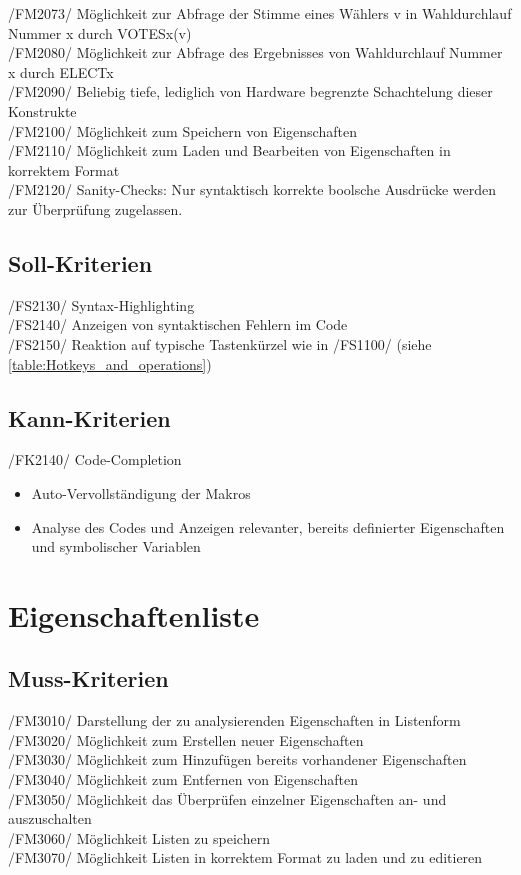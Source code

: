 \documentclass[a4paper]{scrreprt}
\begin{document}
/FM2073/ Möglichkeit zur Abfrage der Stimme eines Wählers v in Wahldurchlauf Nummer x durch VOTESx(v)\\
/FM2080/ Möglichkeit zur Abfrage des Ergebnisses von Wahldurchlauf Nummer x durch ELECTx \\
/FM2090/ Beliebig tiefe, lediglich von Hardware begrenzte Schachtelung dieser Konstrukte \\
/FM2100/ Möglichkeit zum Speichern von Eigenschaften \\
/FM2110/ Möglichkeit zum Laden und Bearbeiten von Eigenschaften in korrektem Format \\
/FM2120/ Sanity-Checks: Nur syntaktisch korrekte boolsche Ausdrücke werden zur Überprüfung zugelassen.

\subsection{Soll-Kriterien}
/FS2130/ Syntax-Highlighting \\
/FS2140/ Anzeigen von syntaktischen Fehlern im Code \\
/FS2150/ Reaktion auf typische Tastenkürzel wie in /FS1100/ (siehe \ref{table:Hotkeys_and_operations}) \\


\subsection{Kann-Kriterien}
/FK2140/ Code-Completion
\begin{itemize}
\item Auto-Vervollständigung der Makros
\item Analyse des Codes und Anzeigen relevanter, bereits definierter Eigenschaften und symbolischer Variablen
\end{itemize}

\section{Eigenschaftenliste}
\subsection{Muss-Kriterien}
/FM3010/ Darstellung der zu analysierenden Eigenschaften in Listenform \\
/FM3020/ Möglichkeit zum Erstellen neuer Eigenschaften \\
/FM3030/ Möglichkeit zum Hinzufügen bereits vorhandener Eigenschaften \\
/FM3040/ Möglichkeit zum Entfernen von Eigenschaften \\
/FM3050/ Möglichkeit das Überprüfen einzelner Eigenschaften an- und auszuschalten \\
/FM3060/ Möglichkeit Listen zu speichern \\
/FM3070/ Möglichkeit Listen in korrektem Format zu laden und zu editieren \\
\end{document}
